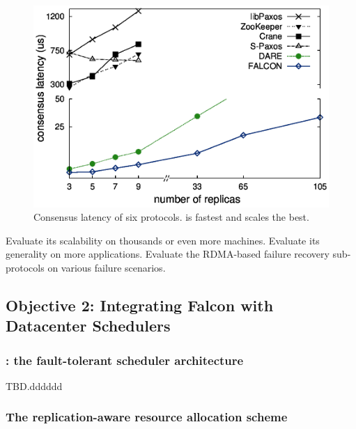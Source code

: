 \begin{figure}[!htb]
\centering
\includegraphics[width=0.34\textheight]{figures/traditional_paxos_latency.ps}
        \vspace{0.1in}
        \caption{Consensus latency of six \paxos protocols. \falcon is fastest 
and scales the best.}
        \label{fig:scalability}
\end{figure}

 Evaluate its scalability on thousands or even more 
machines. Evaluate its generality on more applications. Evaluate the RDMA-based 
failure recovery sub-protocols on various failure scenarios.

\vspace{-.15in}\subsection{Objective 2: 
Integrating Falcon with Datacenter Schedulers}\label{sec:detect}\vspace{-.075in}

\vspace{-.15in}\subsubsection{\tripod: the fault-tolerant scheduler 
architecture} 
\label{sec:scheduler-arch}\vspace{-.075in}

TBD.dddddd


\vspace{-.15in}\subsubsection{The replication-aware resource allocation scheme}
\label{sec:detect-arch}\vspace{-.075in}


